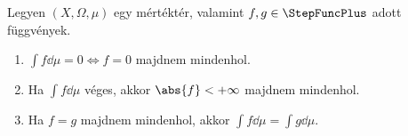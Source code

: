 \documentclass[
]{elteikthesis}[2024/04/26]
\begin{document}
	
	\newpage
	\begin{theorem}{}{}
		 Legyen \( (X, \Omega, \mu) \) egy mértéktér, 
		 valamint \( f, g \in \StepFuncPlus \) adott függvények.
		 \begin{enumerate}
		 	\item\label{eq:majdnem-mindenhol-01}
		 	\( \displaystyle \int f \dd{\mu} = 0 \iff f = 0 \) majdnem mindenhol.
		 	
		 	\item\label{eq:majdnem-mindenhol-02}
		 	Ha \( \displaystyle \int f \dd{\mu}  \) véges, 
		 	akkor \( \abs{f} < +\infty \) majdnem mindenhol.
		 	
		 	\item\label{eq:majdnem-mindenhol-03}
		 	Ha \( f = g \) majdnem mindenhol, 
		 	akkor \( \displaystyle \int f \dd{\mu} = \int g \dd{\mu} \).
		 \end{enumerate}
	\end{theorem}
\end{document}
